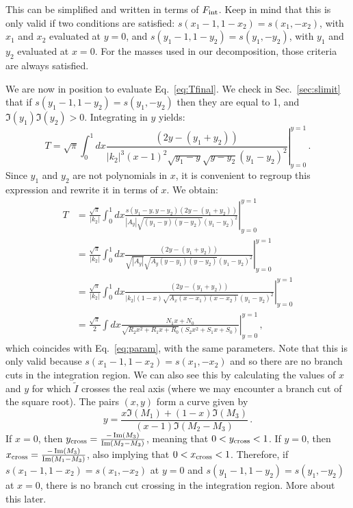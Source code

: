 \documentclass[twoside]{article}
\begin{document}
This can be simplified and written in terms of $F_{\rm int}$. Keep in mind that this is only valid if two conditions are satisfied: $s(x_1-1,1-x_2)=s(x_1,-x_2)$, with $x_1$ and $x_2$ evaluated at $y=0$, and $s(y_1-1,1-y_2)=s(y_1,-y_2)$, with $y_1$ and $y_2$ evaluated at $x=0$. For the masses used in our decomposition, those criteria are always satisfied.

We are now in position to evaluate Eq.~\eqref{eq:Tfinal}. We check in Sec.~\ref{sec:slimit} that if $s(y_1-1,1-y_2)=s(y_1,-y_2)$ then they are equal to 1, and $\Im(y_1) \Im(y_2)>0$. Integrating in $y$ yields:
\begin{equation}
T = \sqrt{\pi}\int_0^1 dx \left.\frac{ (2 y-(y_1+y_2))}{|k_2|^3 (x-1)^2 \sqrt{y_1-y} \sqrt{y-y_2} (y_1-y_2)^2}\right|_{y=0}^{y=1}\,.
\end{equation}
Since $y_1$ and $y_2$ are not polynomials in $x$, it is convenient to regroup this expression and rewrite it in terms of $x$. We obtain:
\begin{align}
T &= \frac{\sqrt{\pi}}{|k_2|}\int_0^1 dx \left.\frac{s(y_1 - y, y - y_2) (2 y-(y_1+y_2))}{|A_y|  \sqrt{(y_1-y)(y-y_2)} (y_1-y_2)^2}\right|_{y=0}^{y=1} \\
&= \frac{\sqrt{\pi}}{|k_2|}\int_0^1 dx \left.\frac{ (2 y-(y_1+y_2))}{\sqrt{|A_y|}  \sqrt{A_y(y-y_1)(y-y_2)} (y_1-y_2)^2}\right|_{y=0}^{y=1} \\
&= \frac{\sqrt{\pi}}{|k_2|}\int_0^1 dx \left.\frac{ (2 y-(y_1+y_2))}{|k_2|(1-x) \sqrt{A_x(x-x_1)(x-x_2)} (y_1-y_2)^2}\right|_{y=0}^{y=1}\\
&= \frac{\sqrt{\pi}}{2}\int dx \left.\frac{N_1 x + N_0}{\sqrt{R_2 x^2 + R_1 x + R_0}\left(S_2 x^2 + S_1 x + S_0\right)}\right|^{y = 1}_{y = 0}\,,
\end{align}
which coincides with Eq.~\eqref{eq:param}, with the same parameters. Note that this is only valid because $s(x_1-1,1-x_2)=s(x_1,-x_2)$ and so there are no branch cuts in the integration region. 
We can also see this by calculating the values of $x$ and $y$ for which $\tilde{I}$ crosses the real axis (where we may encounter a branch cut of the square root). The pairs $(x,y)$ form a curve given by
\begin{equation}
y = \frac{x \Im(M_1) + (1-x)\Im(M_3)}{(x-1)\Im(M_2-M_3)}\,.
\end{equation}
If $x=0$, then $y_{\rm cross} = \frac{-\Im(M_3)}{\Im(M_2-M_3)}$, meaning that $0<y_{\rm cross}<1$. If $y=0$, then $x_{\rm cross} = \frac{-\Im(M_3)}{\Im(M_1-M_3)}$, also implying that $0<x_{\rm cross}<1$. 
Therefore, if $s(x_1-1,1-x_2)=s(x_1,-x_2)$ at $y=0$ and $s(y_1-1,1-y_2)=s(y_1,-y_2)$ at $x=0$, there is no branch cut crossing in the integration region. More about this later.
\end{document}
